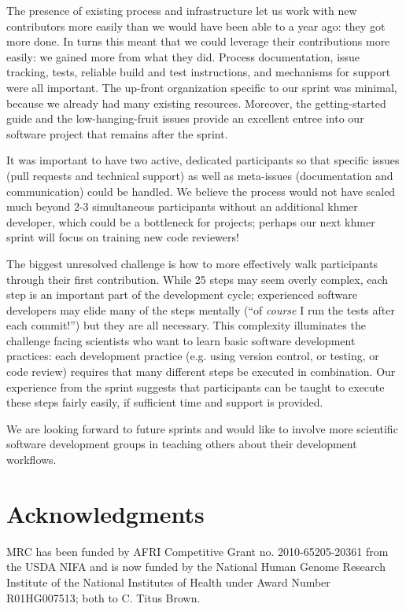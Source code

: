 \documentclass[11pt]{article}
\begin{document}
The presence of existing process and infrastructure let us work with
new contributors more easily than we would have been able to a year
ago: they got more done.  In turns this meant that we could leverage
their contributions more easily: we gained more from what they did.
Process documentation, issue tracking, tests, reliable build and test
instructions, and mechanisms for support were all important.  The
up-front organization specific to our sprint was minimal, because we
already had many existing resources.  Moreover, the getting-started
guide and the low-hanging-fruit issues provide an excellent entree
into our software project that remains after the sprint.

It was important to have two active, dedicated participants so that
specific issues (pull requests and technical support) as well as
meta-issues (documentation and communication) could be handled.  We
believe the process would not have scaled much beyond 2-3 simultaneous
participants without an additional khmer developer, which could be a
bottleneck for projects; perhaps our next khmer sprint will focus on
training new code reviewers!

The biggest unresolved challenge is how to more effectively walk
participants through their first contribution.  While 25 steps may
seem overly complex, each step is an important part of the development
cycle; experienced software developers may elide many of the steps
mentally (``of {\em course} I run the tests after each commit!'') but
they are all necessary.  This complexity illuminates the challenge
facing scientists who want to learn basic software development
practices: each development practice (e.g. using version control, or
testing, or code review) requires that many different steps be
executed in combination.  Our experience from the sprint suggests that
participants can be taught to execute these steps fairly easily, if
sufficient time and support is provided.

We are looking forward to future sprints and would like to involve more
scientific software development groups in teaching others about their
development workflows.



\section*{Acknowledgments}

MRC has been funded by AFRI Competitive Grant no. 2010-65205-20361
from the USDA NIFA and is now funded by the National Human Genome
Research Institute of the National Institutes of Health under Award
Number R01HG007513; both to C. Titus Brown.



\end{document}
